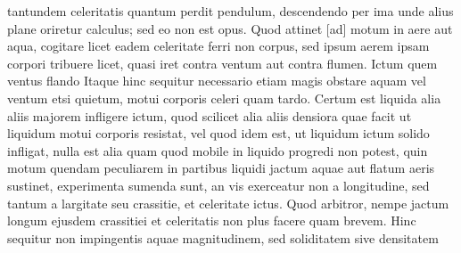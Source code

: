tantundem celeritatis quantum perdit pendulum\protect{}, descendendo per ima
unde alius plane oriretur calculus; sed eo non est opus.
\pend
\pstart
Quod attinet [ad]
motum in aere\protect{} aut aqua\protect{}, cogitare licet eadem celeritate ferri non 
%
%
corpus, sed ipsum aerem
ipsam 
corpori tribuere licet, quasi iret contra ventum aut contra flumen. Ictum 
%
%
quem ventus flando 
Itaque hinc sequitur necessario etiam magis obstare aquam\protect{} vel ventum\protect{} etsi quietum, motui corporis celeri quam tardo.
\pend
\pstart
Certum est liquida alia aliis majorem infligere ictum\protect{}, quod scilicet alia aliis densiora
%
%
quae facit ut liquidum motui corporis resistat, vel quod idem est, ut liquidum ictum solido infligat, nulla est alia quam quod mobile in liquido progredi non potest, quin motum quendam peculiarem in partibus liquidi 
jactum aquae aut flatum aeris\protect{} sustinet, experimenta sumenda sunt, an vis\protect{} exerceatur non a longitudine, sed tantum a largitate seu crassitie, et celeritate ictus. Quod arbitror, nempe jactum 
%
%
longum ejusdem crassitiei et celeritatis non plus facere quam brevem. Hinc sequitur non impingentis aquae magnitudinem, sed soliditatem sive densitatem 

